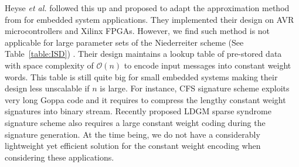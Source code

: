 \documentclass[10pt,journal,compsoc]{IEEEtran}
\begin{document}
Heyse \textit{et al.}\cite{heyse2010low,heyse2012towards} followed this up and proposed to adapt the approximation method from
\cite{sendrier2005encoding} for embedded system applications. They implemented their design on AVR microcontrollers and Xilinx
FPGAs. However, we find such method is not applicable for large parameter sets of the Niederreiter scheme (See Table~\ref{table:ISD})
\cite{courtois2001achieve,landais2012cfs,finiasz2011parallel}. Their design maintains a  lookup table of pre-stored data with space complexity of $\mathcal{O}(n)$ to encode input messages into
constant weight words. This table is still quite big for small embedded systems making their design less unscalable if $n$ is large. For instance, CFS signature scheme\cite{courtois2001achieve} exploits very long Goppa code and it requires
to compress the lengthy constant weight signatures into binary stream. Recently proposed LDGM sparse syndrome signature scheme\cite{baldi2013using} also requires
a large constant weight coding during the signature generation.  At the time being, we do not have a considerably lightweight yet
efficient solution for the constant weight encoding when considering these applications.
\end{document}
